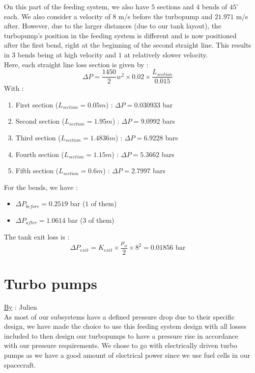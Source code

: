 On this part of the feeding system, we also have $5$ sections and $4$ bends of $45^\circ$ each. We also consider a velocity of $8$ m/s before the turbopump and $21.971$ m/s after. However, due to the larger distances (due to our tank layout), the turbopump's position in the feeding system is different and is now positioned after the first bend, right at the beginning of the second straight line. This results in $3$ bends being at high velocity and $1$ at relatively slower velocity.\\

Here, each straight line loss section is given by : 
$$
\Delta P = \frac {1450} 2 w^2 \times 0.02 \times \frac{L_{section}}{0.015}
$$
With : 

\begin{enumerate}
	\item First section ($L_{section}=0.05m$) : $\Delta P = 0.030933$ bar
	\item Second section ($L_{section}=1.95m$) : $\Delta P = 9.0992$ bars
	\item Third section ($L_{section}=1.4836m$) : $\Delta P = 6.9228$ bars
	\item Fourth section ($L_{section}=1.15m$) : $\Delta P = 5.3662$ bars
	\item Fifth section ($L_{section}=0.6m$) : $\Delta P = 2.7997$ bars
\end{enumerate}

For the bends, we have :

\begin{itemize}
	\item $\Delta P_{before} = 0.2519 $ bar ($1$ of them)
	\item $\Delta P_{after} = 1.0614$ bar ($3$ of them)
\end{itemize}

The tank exit loss is :
$$
\Delta P_{exit} = K_{exit} \times \frac{\rho_o}2 \times 8 ^ 2 = 0.01856\text{ bar}
$$
\section{Turbo pumps}
\qquad \underline{By} : Julien\\

As most of our subsystems have a defined pressure drop due to their specific design, we have made the choice to use this feeding system design with all losses included to then design our turbopumps to have a pressure rise in accordance with our pressure requirements. We chose to go with electrically driven turbo pumps as we have a good amount of electrical power since we use fuel cells in our spacecraft.\\

